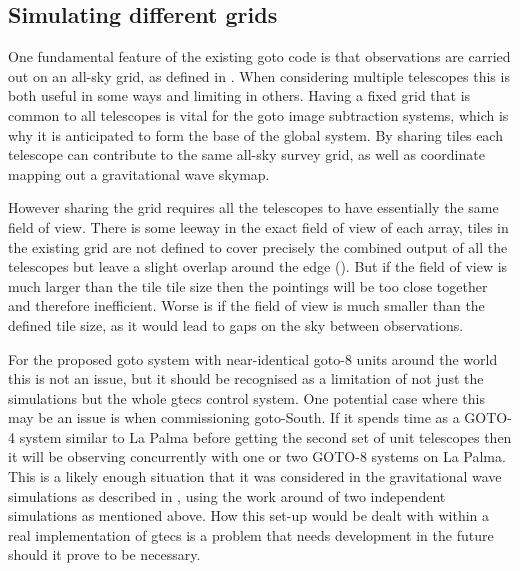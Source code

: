 \begin{colsection}
\begin{colsection}
\clearpage

\end{colsection}


\subsection{Simulating different grids}
\label{sec:multi_grid_scheduling}
\begin{colsection}

One fundamental feature of the existing \gls{goto} code is that observations are carried out on an all-sky grid, as defined in . When considering multiple telescopes this is both useful in some ways and limiting in others. Having a fixed grid that is common to all telescopes is vital for the \gls{goto} image subtraction systems, which is why it is anticipated to form the base of the global system. By sharing tiles each telescope can contribute to the same all-sky survey grid, as well as coordinate mapping out a gravitational wave skymap.

However sharing the grid requires all the telescopes to have essentially the same field of view. There is some leeway in the exact field of view of each array, tiles in the existing grid are not defined to cover precisely the combined output of all the telescopes but leave a slight overlap around the edge (). But if the field of view is much larger than the tile tile size then the pointings will be too close together and therefore inefficient. Worse is if the field of view is much smaller than the defined tile size, as it would lead to gaps on the sky between observations.

For the proposed \gls{goto} system with near-identical \gls{goto}-8 units around the world this is not an issue, but it should be recognised as a limitation of not just the simulations but the whole \gls{gtecs} control system. One potential case where this may be an issue is when commissioning \gls{goto}-South. If it spends time as a GOTO-4 system similar to La Palma before getting the second set of unit telescopes then it will be observing concurrently with one or two GOTO-8 systems on La Palma. This is a likely enough situation that it was considered in the gravitational wave simulations as described in , using the work around of two independent simulations as mentioned above. How this set-up would be dealt with within a real implementation of \gls{gtecs} is a problem that needs development in the future should it prove to be necessary.

\end{colsection}


\end{colsection}

